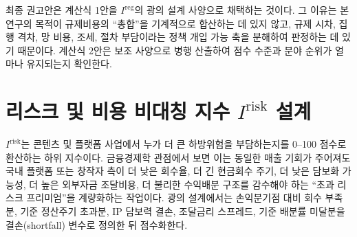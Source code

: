 \documentclass[11pt,a4paper]{report}
\begin{document}
최종 권고안은 계산식 1안을 $I^{\mathrm{reg}}$의 광의 설계 사양으로 채택하는 것이다. 그 이유는 본 연구의 목적이 규제비용의 ``총합''을 기계적으로 합산하는 데 있지 않고, 규제 시차, 집행 격차, 망 비용, 조세, 절차 부담이라는 정책 개입 가능 축을 분해하여 판정하는 데 있기 때문이다. 계산식 2안은 보조 사양으로 병행 산출하여 점수 수준과 분야 순위가 얼마나 유지되는지 확인한다.

\section{\texorpdfstring{리스크 및 비용 비대칭 지수 $I^{\mathrm{risk}}$ 설계}{리스크 및 비용 비대칭 지수 Irisk 설계}}
$I^{\mathrm{risk}}$는 콘텐츠 및 플랫폼 사업에서 누가 더 큰 하방위험을 부담하는지를 0--100 점수로 환산하는 하위 지수이다. 금융경제학 관점에서 보면 이는 동일한 매출 기회가 주어져도 국내 플랫폼 또는 창작자 측이 더 낮은 회수율, 더 긴 현금회수 주기, 더 낮은 담보화 가능성, 더 높은 외부자금 조달비용, 더 불리한 수익배분 구조를 감수해야 하는 ``초과 리스크 프리미엄''을 계량화하는 작업이다. 광의 설계에서는 손익분기점 대비 회수 부족분, 기준 정산주기 초과분, IP 담보력 결손, 조달금리 스프레드, 기준 배분률 미달분을 결손(shortfall) 변수로 정의한 뒤 점수화한다.
\end{document}
